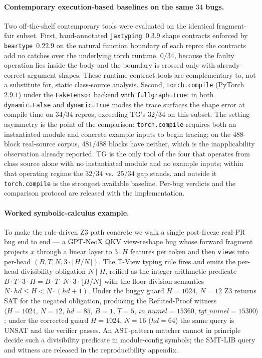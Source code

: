 \paragraph{Contemporary execution-based baselines on the same $34$ bugs.}
Two off-the-shelf contemporary tools were evaluated on the
identical fragment-fair subset.
First, hand-annotated \texttt{jaxtyping}~$0.3.9$ shape
contracts enforced by \texttt{beartype}~$0.22.9$ on the
natural function boundary of each repro: the contracts add no
catches over the underlying torch runtime, $0/34$, because the
faulty operation lies inside the body and the boundary is
crossed only with already-correct argument shapes.  These
runtime contract tools are complementary to, not a substitute
for, static class-source analysis.
Second, \texttt{torch.compile} (PyTorch~$2.9.1$) under the
\texttt{FakeTensor} backend with \texttt{fullgraph=True}: in
both \texttt{dynamic=False} and \texttt{dynamic=True} modes the
trace surfaces the shape error at compile time on $34/34$
repros, exceeding TG's $32/34$ on this subset.  The setting
asymmetry is the point of the comparison: \texttt{torch.compile}
requires both an instantiated module and concrete example
inputs to begin tracing; on the $488$-block real-source corpus,
$481/488$ blocks have neither, which is the inapplicability
observation already reported.  TG is the only tool of the four
that operates from class source alone with no instantiated
module and no example inputs; within that operating regime the
$32/34$ vs.\ $25/34$ gap stands, and outside it
\texttt{torch.compile} is the strongest available baseline.
Per-bug verdicts and the comparison protocol are released with
the implementation.

\paragraph{Worked symbolic-calculus example.}
To make the rule-driven Z3 path concrete we walk a single
post-freeze real-PR bug end to end --- a GPT-NeoX QKV
view-reshape bug whose forward fragment projects $x$ through a
linear layer to $3{\cdot}H$ features per token and then
\texttt{view}s into per-head $(B,T,N,3{\cdot}\lfloor H/N \rfloor)$.
The T-View typing rule fires and emits the per-head
divisibility obligation $N \mid H$, reified as the
integer-arithmetic predicate
$B{\cdot}T{\cdot}3{\cdot}H = B{\cdot}T{\cdot}N{\cdot}3{\cdot}\lfloor H/N \rfloor$
with the floor-division semantics $N{\cdot}\mathit{hd} \le H < N{\cdot}(\mathit{hd}{+}1)$.
Under the buggy guard $H{=}1024,\,N{=}12$ Z3 returns SAT for the
negated obligation, producing the Refuted-Proof witness
$\langle H{=}1024,\,N{=}12,\,\mathit{hd}{=}85,\,B{=}1,\,T{=}5,\,
\mathit{in\_numel}{=}15360,\,\mathit{tgt\_numel}{=}15300 \rangle$;
under the corrected guard $H{=}1024,\,N{=}16$ ($\mathit{hd}{=}64$)
the same query is UNSAT and the verifier passes.  An AST-pattern
matcher cannot in principle decide such a divisibility predicate
in module-config symbols; the SMT-LIB query and witness are
released in the reproducibility appendix.

